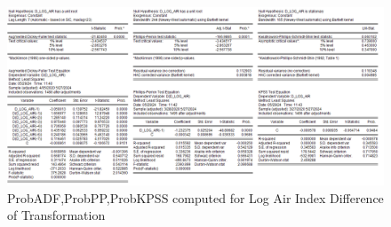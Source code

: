 \documentclass{article} %
\begin{document}
\begin{figure}[H]
    \centering
    \includegraphics[width=\linewidth]{images/image16.png}
    \caption{ProbADF,ProbPP,ProbKPSS computed for Log Air Index Difference of Transformation}
\end{figure}
\end{document}
